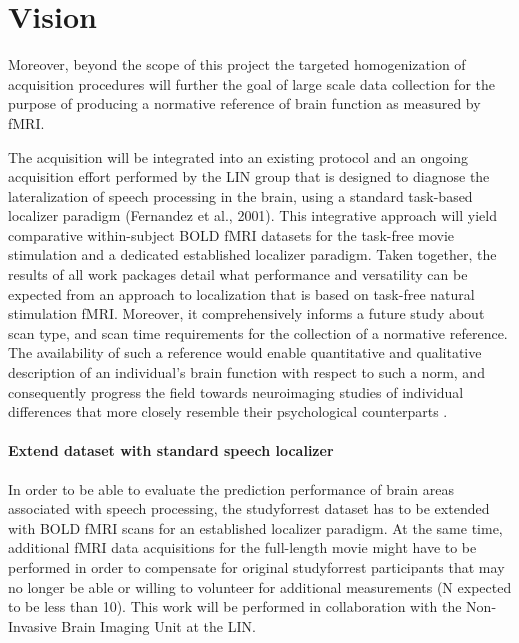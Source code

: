 \section{Vision}
%
Moreover, beyond the scope of this project the targeted homogenization of
acquisition procedures will further the goal of large scale data collection for
the purpose of producing a normative reference of brain function as measured by
fMRI.

The acquisition will be integrated into an existing protocol and an ongoing
acquisition effort performed by the LIN group that is designed to diagnose the
lateralization of speech processing in the brain, using a standard task-based
localizer paradigm (Fernandez et al., 2001).
%
This integrative approach will yield comparative within-subject BOLD fMRI
datasets for the task-free movie stimulation and a dedicated established
localizer paradigm.
%
Taken together, the results of all work packages detail what performance and
versatility can be expected from an approach to localization that is based on
task-free natural stimulation fMRI.
%
Moreover, it comprehensively informs a future study about scan type, and scan
time requirements for the collection of a normative reference.
%
The availability of such a reference would enable quantitative and qualitative
description of an individual's brain function with respect to such a norm, and
consequently progress the field towards neuroimaging studies of individual
differences that more closely resemble their psychological counterparts
\citep{dubois2016building}.


\paragraph{Extend dataset with standard speech localizer}
%
In order to be able to evaluate the prediction performance of brain areas
associated with speech processing, the studyforrest dataset has to be extended
with BOLD fMRI scans for an established localizer paradigm.
%
At the same time, additional fMRI data acquisitions for the full-length movie
might have to be performed in order to compensate for original studyforrest
participants that may no longer be able or willing to volunteer for additional
measurements (N expected to be less than 10).
%
This work will be performed in
collaboration with the Non-Invasive Brain Imaging Unit at the LIN.



